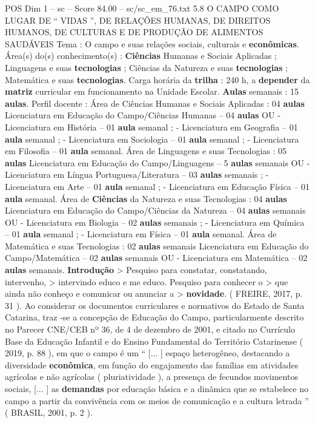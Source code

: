 \begin{textsample}{POS Dim 1 – sc – Score 84.00 – sc/sc\_em\_76.txt}  \label{ex:f1_pos_002}
5.8 O CAMPO COMO LUGAR DE “ VIDAS ”, DE RELAÇÕES HUMANAS, DE DIREITOS HUMANOS, DE CULTURAS E DE PRODUÇÃO DE ALIMENTOS SAUDÁVEIS Tema : O campo e suas relações sociais, culturais e \textbf{econômicas}.
Área(s) do(s) conhecimento(s) : \textbf{Ciências} Humanas e Sociais Aplicadas ; Linguagens e suas \textbf{tecnologias} ; Ciências da Natureza e suas \textbf{tecnologias} ; Matemática e suas \textbf{tecnologias}.
Carga horária da \textbf{trilha} : 240 h, a \textbf{depender} da \textbf{matriz} curricular em funcionamento na Unidade Escolar. \textbf{Aulas} semanais : 15 \textbf{aulas}.
Perfil docente : Área de Ciências Humanas e Sociais Aplicadas : 04 \textbf{aulas} Licenciatura em Educação do Campo/Ciências Humanas – 04 \textbf{aulas} OU - Licenciatura em História – 01 \textbf{aula} semanal ; - Licenciatura em Geografia – 01 \textbf{aula} semanal ; - Licenciatura em Sociologia – 01 \textbf{aula} semanal ; - Licenciatura em Filosofia – 01 \textbf{aula} semanal.
Área de Linguagens e suas Tecnologias : 05 \textbf{aulas} Licenciatura em Educação do Campo/Linguagens – 5 \textbf{aulas} semanais OU - Licenciatura em Língua Portuguesa/Literatura – 03 \textbf{aulas} semanais ; - Licenciatura em Arte – 01 \textbf{aula} semanal ; - Licenciatura em Educação Física – 01 \textbf{aula} semanal.
Área de \textbf{Ciências} da Natureza e suas Tecnologias : 04 \textbf{aulas} Licenciatura em Educação do Campo/Ciências da Natureza – 04 \textbf{aulas} semanais OU - Licenciatura em Biologia – 02 \textbf{aulas} semanais ; - Licenciatura em Química – 01 \textbf{aula} semanal ; - Licenciatura em Física – 01 \textbf{aula} semanal.
Área de Matemática e suas Tecnologias : 02 \textbf{aulas} semanais Licenciatura em Educação do Campo/Matemática – 02 \textbf{aulas} semanais OU - Licenciatura em Matemática – 02 \textbf{aulas} semanais. \textbf{Introdução} > Pesquiso para constatar, constatando, intervenho, > intervindo educo e me educo.
Pesquiso para conhecer o > que ainda não conheço e comunicar ou anunciar a > \textbf{novidade}. ( FREIRE, 2017, p. 31 ).
Ao considerar os documentos curriculares e normativos do Estado de Santa Catarina, traz -se a concepção de Educação do Campo, particularmente descrito no Parecer CNE/CEB nº 36, de 4 de dezembro de 2001, e citado no Currículo Base da Educação Infantil e do Ensino Fundamental do Território Catarinense ( 2019, p. 88 ), em que o campo é um “ [... ] espaço heterogêneo, destacando a diversidade \textbf{econômica}, em função do engajamento das famílias em atividades agrícolas e não agrícolas ( pluriatividade ), a presença de fecundos movimentos sociais, [... ] as \textbf{demandas} por educação básica e a dinâmica que se estabelece no campo a partir da convivência com os meios de comunicação e a cultura letrada ” ( BRASIL, 2001, p. 2 ).

\end{textsample}

